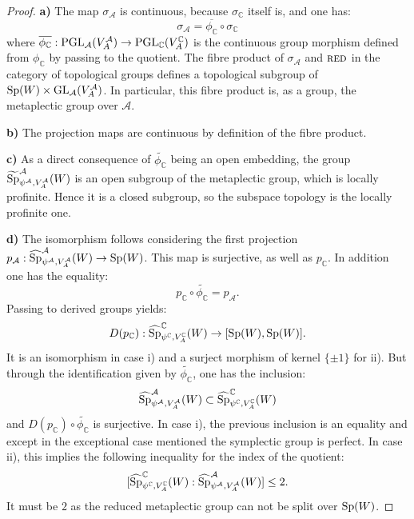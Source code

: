 \documentclass[11pt]{article}
\theoremstyle{plain}
\theoremstyle{definition}
\theoremstyle{plain}
\theoremstyle{definition}
\theoremstyle{plain}
\begin{document}
\begin{proof} \textbf{a)} The map $\sigma_\mathcal{A}$ is continuous, because $\sigma_\mathbb{C}$ itself is, and one has:
$$\sigma_\mathcal{A} = \overline{\phi_\mathbb{C}} \circ \sigma_\mathbb{C}$$
where $\overline{\phi_\mathbb{C}} : \textup{PGL}_\mathcal{A}(V_A^\mathcal{A}) \to \textup{PGL}_\mathbb{C}(V_A^\mathbb{C})$ is the continuous group morphism defined from $\phi_\mathbb{C}$ by passing to the quotient. The fibre product of $\sigma_\mathcal{A}$ and $\textup{\textsc{red}}$ in the category of topological groups defines a topological subgroup of $\textup{Sp}(W) \times \textup{GL}_\mathcal{A}(V_A^\mathcal{A})$. In particular, this fibre product is, as a group, the metaplectic group over $\mathcal{A}$.

\noindent \textbf{b)} The projection maps are continuous by definition of the fibre product.

\noindent \textbf{c)} As a direct consequence of $\widetilde{\phi_\mathbb{C}}$ being an open embedding, the group $\widetilde{\textup{Sp}}_{\psi^\mathcal{A},V_A^\mathcal{A}}^\mathcal{A}(W)$ is an open subgroup of the metaplectic group, which is locally profinite. Hence it is a closed subgroup, so the subspace topology is the locally profinite one.

\noindent \textbf{d)} The isomorphism follows considering the first projection $p_\mathcal{A} : \widehat{\textup{Sp}}_{\psi^\mathcal{A},V_A^\mathcal{A}}^\mathcal{A}(W)  \to \textup{Sp}(W)$. This map is surjective, as well as $p_\mathbb{C}$. In addition one has the equality:
$$p_\mathbb{C} \circ \widetilde{\phi_\mathbb{C}}= p_\mathcal{A} .$$
Passing to derived groups yields:
$$D(p_\mathbb{C}) : \widehat{\textup{Sp}}_{\psi^\mathbb{C},V_A^\mathbb{C}}^\mathbb{C}(W) \to [\textup{Sp}(W),\textup{Sp}(W)].$$
It is an isomorphism in case i) and a surject morphism of kernel $\{ \pm 1 \}$ for ii). But through the identification given by $\widetilde{\phi_\mathbb{C}}$, one has the inclusion:
$$\widehat{\textup{Sp}}_{\psi^\mathcal{A},V_A^\mathcal{A}}^\mathcal{A}(W) \subset \widehat{\textup{Sp}}_{\psi^\mathbb{C},V_A^\mathbb{C}}^\mathbb{C}(W)$$
and $D(p_\mathbb{C}) \circ \widetilde{\phi_\mathbb{C}}$ is surjective. In case i), the previous inclusion is an equality and except in the exceptional case mentioned the symplectic group is perfect. In case ii), this implies the following inequality for the index of the quotient:
$$[\widehat{\textup{Sp}}_{\psi^\mathbb{C},V_A^\mathbb{C}}^\mathbb{C}(W):\widehat{\textup{Sp}}_{\psi^\mathcal{A},V_A^\mathcal{A}}^\mathcal{A}(W)] \leq 2.$$
It must be $2$ as the reduced metaplectic group can not be split over $\textup{Sp}(W)$. \end{proof}
\end{document}
